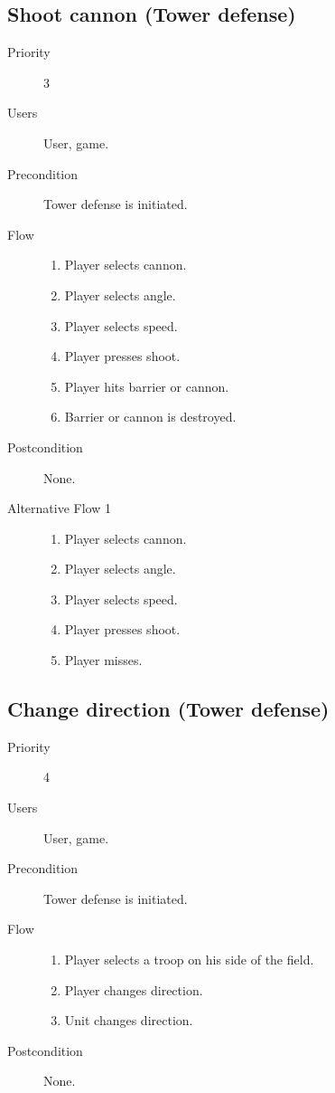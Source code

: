 \documentclass[12pt,a4paper]{article}
\begin{document}
\subsection{Shoot cannon (Tower defense)}
\begin{description}
\item[Priority] 3
\item[Users] User, game.
\item[Precondition] Tower defense is initiated.
\item[Flow]\mbox{}
  \begin{enumerate}
  \item Player selects cannon.
  \item Player selects angle.
  \item Player selects speed.
  \item Player presses shoot.
  \item Player hits barrier or cannon.
  \item Barrier or cannon is destroyed.
  \end{enumerate}
\item[Postcondition] None.
\item[Alternative Flow 1]\mbox{}
  \begin{enumerate}
  \item Player selects cannon.
  \item Player selects angle.
  \item Player selects speed.
  \item Player presses shoot.
  \item Player misses.
  \end{enumerate}
\end{description}

\subsection{Change direction (Tower defense)}
\begin{description}
\item[Priority] 4
\item[Users] User, game.
\item[Precondition] Tower defense is initiated.
\item[Flow]\mbox{}
  \begin{enumerate}
  \item Player selects a troop on his side of the field.
  \item Player changes direction.
  \item Unit changes direction.
  \end{enumerate}
\item[Postcondition] None.
\end{description}
\end{document}
